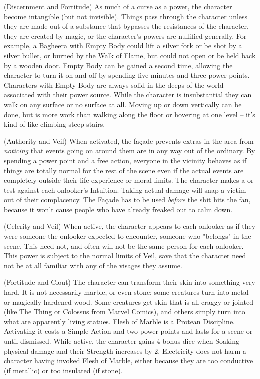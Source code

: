  (Discernment and Fortitude)
As much of a curse as a power, the character become intangible (but not invisible). Things pass through the character unless they are made out of a substance that bypasses the resistances of the character, they are created by magic, or the character's powers are nullified generally. For example, a Bagheera with Empty Body could lift a silver fork or be shot by a silver bullet, or burned by the Walk of Flame, but could not open or be held back by a wooden door. Empty Body can be gained a second time, allowing the character to turn it on and off by spending five minutes and three power points. Characters with Empty Body are always solid in the deeps of the world associated with their power source. While the character is insubstantial they can walk on any surface or no surface at all. Moving up or down vertically can be done, but is more work than walking along the floor or hovering at one level -- it's kind of like climbing steep stairs.

 (Authority and Veil)
When activated, the fa\c{c}ade prevents extras in the area from \textit{noticing} that events going on around them are in any way out of the ordinary. By spending a power point and a free action, everyone in the vicinity behaves as if things are totally normal for the rest of the scene even if the actual events are completely outside their life experience or moral limits. The character makes a  or  test against each onlooker's Intuition. Taking actual damage will snap a victim out of their complacency. The Fa\c{c}ade has to be used \textit{before} the shit hits the fan, because it won't cause people who have already freaked out to calm down.

 (Celerity and Veil)
When active, the character appears to each onlooker as if they were someone the onlooker expected to encounter, someone who "belongs" in the scene. This need not, and often will not be the same person for each onlooker. This power is subject to the normal limits of Veil, save that the character need not be at all familiar with any of the visages they assume.

 (Fortitude and Clout)
The character can transform their skin into something very hard. It is not necessarily marble, or even stone: some creatures turn into metal or magically hardened wood. Some creatures get skin that is all craggy or jointed (like The Thing or Colossus from Marvel Comics), and others simply turn into what are apparently living statues. Flesh of Marble is a Protean Discipline. Activating it costs a Simple Action and two power points and lasts for a scene or until dismissed. While active, the character gains 4 bonus dice when Soaking physical damage and their Strength increases by 2. Electricity does not harm a character having invoked Flesh of Marble, either because they are too conductive (if metallic) or too insulated (if stone). 

